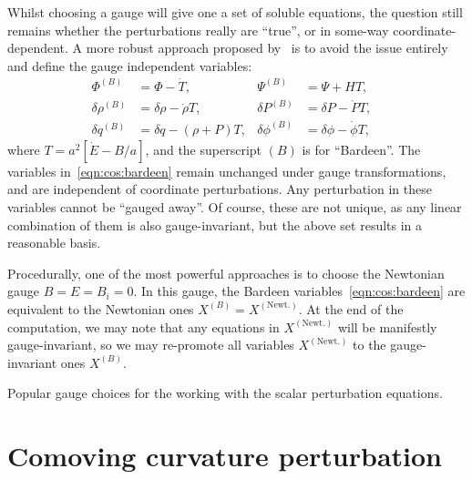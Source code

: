 Whilst choosing a gauge will give one a set of soluble equations, the question still remains whether the perturbations really are ``true'', or in some-way coordinate-dependent. A more robust approach proposed by~\cite{Bardeen_GI} is to avoid the issue entirely and define the gauge independent variables:
\begin{align}
  \Phi^{(B)} &=  \Phi - \dot{T}, &
  \Psi^{(B)} &=  \Psi + HT, \nonumber \\
  \delta\rho^{(B)} &= \delta\rho - \dot{\rho}T, &
  \delta P^{(B)} &= \delta P - \dot{P}T, & \nonumber\\
  \delta q^{(B)} &= \delta q - (\rho + P)T, &
  \delta \phi^{(B)} &= \delta \phi - \dot{\phi}T, 
  \label{eqn:cos:bardeen}
\end{align}
where \(T = a^2[\dot{E}-B/a]\), and the superscript \((B)\) is for ``Bardeen''. The variables in~\eqref{eqn:cos:bardeen} remain unchanged under gauge transformations, and are independent of coordinate perturbations. Any perturbation in these variables cannot be ``gauged away''. Of course, these are not unique, as any linear combination of them is also gauge-invariant, but the above set results in a reasonable basis. 

Procedurally, one of  the most powerful approaches is to choose the Newtonian gauge \({B=E=B_i=0}\). In this gauge, the Bardeen variables~\eqref{eqn:cos:bardeen} are equivalent to the Newtonian ones \(X^{(B)}=X^{(\text{Newt.})}\). At the end of the computation, we may note that any equations in \(X^{(\text{Newt.})}\) will be manifestly gauge-invariant, so we may re-promote all variables \(X^{(\text{Newt.})}\) to the gauge-invariant ones \(X^{(B)}\).


\begin{table}[tp]
  \centering
  
\caption{Popular gauge choices for the working with the scalar perturbation equations.}\label{tab:cos:gauge_choice}
\end{table}

\section{Comoving curvature perturbation}
\label{cos:sec:comoving_curvature_perturbation}

